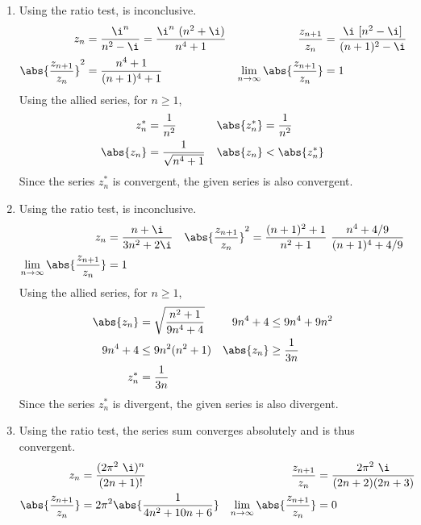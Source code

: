 \begin{enumerate}
    \item Using the ratio test, is inconclusive.
          \begin{align}
              z_n                                & = \frac{\i^n}{n^2 - \i}
              = \frac{\i^n\ (n^2 + \i)}{n^4 + 1} &
              \frac{z_{n+1}}{z_n}                & = \frac{\i\ [n^2 - \i]}
              {(n+1)^2 - \i}                                                         \\
              \abs{\frac{z_{n+1}}{z_n}}^2        & = \frac{n^4 + 1}{(n + 1)^4 + 1} &
              \lim_{n \to \infty}
              \abs{\frac{z_{n+1}}{z_n}}          & = 1
          \end{align}
          Using the allied series, for $ n \geq 1 $,
          \begin{align}
              z^*_n       & = \frac{1}{n^2}            &
              \abs{z^*_n} & = \frac{1}{n^2}              \\
              \abs{z_n}   & = \frac{1}{\sqrt{n^4 + 1}} &
              \abs{z_n}   & < \abs{z^*_n}
          \end{align}
          Since the series $ z^*_n $ is convergent, the given series is also
          \textcolor{y_h}{convergent}.

    \item Using the ratio test, is inconclusive.
          \begin{align}
              z_n                         & = \frac{n + \i}{3n^2 + 2\i}   &
              \abs{\frac{z_{n+1}}{z_n}}^2 & = \frac{(n+1)^2 + 1}{n^2 + 1}
              \ \frac{n^4 + 4/9}{(n+1)^4 + 4/9}                             \\
              \lim_{n \to \infty}
              \abs{\frac{z_{n+1}}{z_n}}   & = 1
          \end{align}
          Using the allied series, for $ n \geq 1 $,
          \begin{align}
              \abs{z_n} & = \sqrt{\frac{n^2 + 1}{9n^4 + 4}} &
              9n^4 + 4  & \leq 9n^4 + 9n^2                    \\
              9n^4 + 4  & \leq 9n^2(n^2 + 1)                &
              \abs{z_n} & \geq \frac{1}{3n}                   \\
              z_n^*     & = \frac{1}{3n}
          \end{align}
          Since the series $ z^*_n $ is divergent, the given series is also
          \textcolor{y_p}{divergent}.

    \item Using the ratio test, the series sum converges absolutely and is thus
          \textcolor{y_h}{convergent}.
          \begin{align}
              z_n                       & = \frac{(2\pi^2\ \i)^n}{(2n+1)!}        &
              \frac{z_{n+1}}{z_n}       & = \frac{2\pi^2\ \i}{(2n+2)(2n+3)}         \\
              \abs{\frac{z_{n+1}}{z_n}} & = 2\pi^2 \abs{\frac{1}{4n^2 + 10n + 6}} &
              \lim_{n \to \infty}
              \abs{\frac{z_{n+1}}{z_n}} & = 0
          \end{align}


\end{enumerate}
